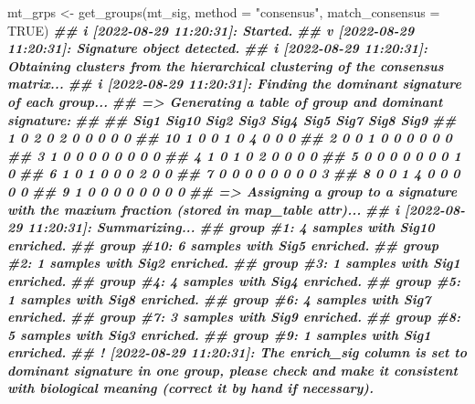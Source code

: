 \documentclass[
  12pt,
  a4paper,
  twoside]{book}
\newenvironment{Shaded}{\begin{snugshade}}{\end{snugshade}}
\newcommand{\AttributeTok}[1]{\textcolor[rgb]{0.77,0.63,0.00}{#1}}
\newcommand{\ConstantTok}[1]{\textcolor[rgb]{0.00,0.00,0.00}{#1}}
\newcommand{\DocumentationTok}[1]{\textcolor[rgb]{0.56,0.35,0.01}{\textbf{\textit{#1}}}}
\newcommand{\FunctionTok}[1]{\textcolor[rgb]{0.00,0.00,0.00}{#1}}
\newcommand{\NormalTok}[1]{#1}
\newcommand{\OtherTok}[1]{\textcolor[rgb]{0.56,0.35,0.01}{#1}}
\newcommand{\StringTok}[1]{\textcolor[rgb]{0.31,0.60,0.02}{#1}}
\begin{document}
\begin{Shaded}
\begin{Highlighting}[]
\NormalTok{mt\_grps }\OtherTok{\textless{}{-}} \FunctionTok{get\_groups}\NormalTok{(mt\_sig, }\AttributeTok{method =} \StringTok{"consensus"}\NormalTok{, }\AttributeTok{match\_consensus =} \ConstantTok{TRUE}\NormalTok{)}
\DocumentationTok{\#\# i [2022{-}08{-}29 11:20:31]: Started.}
\DocumentationTok{\#\# v [2022{-}08{-}29 11:20:31]: \textquotesingle{}Signature\textquotesingle{} object detected.}
\DocumentationTok{\#\# i [2022{-}08{-}29 11:20:31]: Obtaining clusters from the hierarchical clustering of the consensus matrix...}
\DocumentationTok{\#\# i [2022{-}08{-}29 11:20:31]: Finding the dominant signature of each group...}
\DocumentationTok{\#\# =\textgreater{} Generating a table of group and dominant signature:}
\DocumentationTok{\#\#     }
\DocumentationTok{\#\#      Sig1 Sig10 Sig2 Sig3 Sig4 Sig5 Sig7 Sig8 Sig9}
\DocumentationTok{\#\#   1     0     2    0    2    0    0    0    0    0}
\DocumentationTok{\#\#   10    1     0    0    1    0    4    0    0    0}
\DocumentationTok{\#\#   2     0     0    1    0    0    0    0    0    0}
\DocumentationTok{\#\#   3     1     0    0    0    0    0    0    0    0}
\DocumentationTok{\#\#   4     1     0    1    0    2    0    0    0    0}
\DocumentationTok{\#\#   5     0     0    0    0    0    0    0    1    0}
\DocumentationTok{\#\#   6     1     0    1    0    0    0    2    0    0}
\DocumentationTok{\#\#   7     0     0    0    0    0    0    0    0    3}
\DocumentationTok{\#\#   8     0     0    1    4    0    0    0    0    0}
\DocumentationTok{\#\#   9     1     0    0    0    0    0    0    0    0}
\DocumentationTok{\#\# =\textgreater{} Assigning a group to a signature with the maxium fraction (stored in \textquotesingle{}map\_table\textquotesingle{} attr)...}
\DocumentationTok{\#\# i [2022{-}08{-}29 11:20:31]: Summarizing...}
\DocumentationTok{\#\#  group \#1: 4 samples with Sig10 enriched.}
\DocumentationTok{\#\#  group \#10: 6 samples with Sig5 enriched.}
\DocumentationTok{\#\#  group \#2: 1 samples with Sig2 enriched.}
\DocumentationTok{\#\#  group \#3: 1 samples with Sig1 enriched.}
\DocumentationTok{\#\#  group \#4: 4 samples with Sig4 enriched.}
\DocumentationTok{\#\#  group \#5: 1 samples with Sig8 enriched.}
\DocumentationTok{\#\#  group \#6: 4 samples with Sig7 enriched.}
\DocumentationTok{\#\#  group \#7: 3 samples with Sig9 enriched.}
\DocumentationTok{\#\#  group \#8: 5 samples with Sig3 enriched.}
\DocumentationTok{\#\#  group \#9: 1 samples with Sig1 enriched.}
\DocumentationTok{\#\# ! [2022{-}08{-}29 11:20:31]: The \textquotesingle{}enrich\_sig\textquotesingle{} column is set to dominant signature in one group, please check and make it consistent with biological meaning (correct it by hand if necessary).}

\end{Highlighting}
\end{Shaded}
\end{document}

